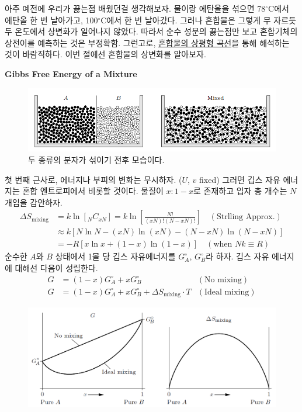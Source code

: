 \documentclass{article}
\begin{document}
아주 예전에 우리가 끓는점 배웠던걸 생각해보자. 물이랑 에탄올을 섞으면 78$^\circ$C에서 에탄올 한 번 날아가고, 100$^\circ$C에서 한 번 날아갔다. 그러나 혼합물은 그렇게 무 자르듯 두 온도에서 상변화가 일어나지 않았다. 따라서 순수 성분의 끓는점만 보고 혼합기체의 상전이를 예측하는 것은 부정확함. 그런고로, \underline{혼합물의 상평형 곡선}을 통해 해석하는 것이 바람직하다. 이번 절에선 혼합물의 상변화를 알아보자. 


\vspace{3mm}\noindent
\textbf{Gibbs Free Energy of a Mixture}

\begin{figure}[h]
    \centering
    \includegraphics[width=0.75\linewidth]{images/fig4_1.png}
    \caption{두 종류의 분자가 섞이기 전후 모습이다.}
\end{figure}

첫 번째 근사로, 에너지나 부피의 변화는 무시하자. ($U$, $v$ fixed) 그러면 깁스 자유 에너지는 혼합 엔트로피에서 비롯할 것이다. 물질이 $x:1-x$로 존재하고 입자 총 개수는 $N$개임을 감안하자.
\begin{align}
    \Delta S_{\text{mixing}} &= k \ln [ {}_{N}C_{xN}] = k \ln \left[ \frac{N!}{(xN)! (N-xN)!} \right] \quad (\text{Strlling Approx.})\\
    &\approx k [ N \ln N - (xN) \ln(xN) - (N-xN) \ln (N-xN) ] \\
    &= -R[x\ln x + (1-x) \ln (1-x) ] \quad (\text{when }Nk \equiv R)
\end{align}
순수한 $A$와 $B$ 상태에서 1몰 당 깁스 자유에너지를 $G_A^\circ$, $G_B^\circ$라 하자. 깁스 자유 에너지에 대해선 다음이 성립한다.
\begin{align}
    G &= (1-x)G_A^\circ + xG_B^\circ  &(\text{No mixing})\\
    G &= (1-x)G_A^\circ + xG_B^\circ + \Delta S_{\text{mixing}} \cdot T &(\text{Ideal mixing})
\end{align}

\begin{figure}[h]
    \centering
    \includegraphics[width=0.7\linewidth]{images/fig4_2.png}
\end{figure}
\end{document}
